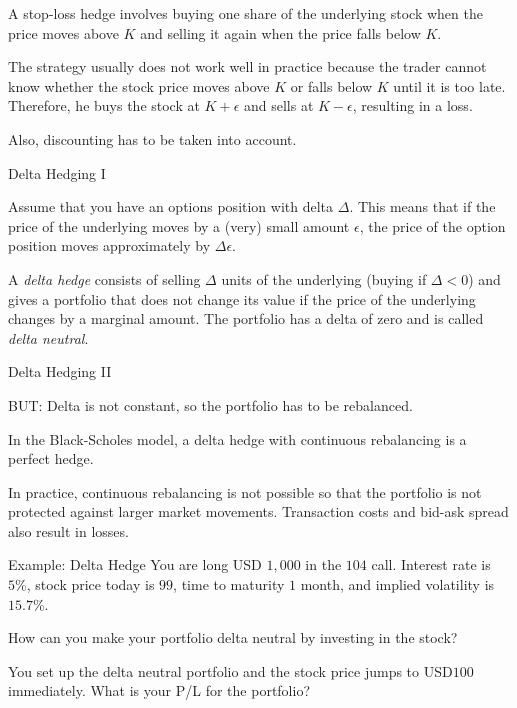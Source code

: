 	A stop-loss hedge involves buying one share of the underlying stock when
  the price moves above $K$ and selling it again when the price falls below $K$.

	The strategy usually does not work well in practice because the trader
  cannot know whether the stock price moves above $K$ or falls below $K$ until
  it is too late. Therefore, he buys the stock at $K+\epsilon$ and sells at
  $K-\epsilon$, resulting in a loss.

	Also, discounting has to be taken into account.


{Delta Hedging I}


	Assume that you have an options position with delta $\Delta$. This means
  that if the price of the underlying moves by a (very) small amount $\epsilon$, the
  price of the option position moves approximately by $\Delta \epsilon$.

	A \emph{delta hedge} consists of selling $\Delta$ units of the
  underlying (buying if $\Delta <0$) and gives a portfolio that does not
  change its value if the price of the underlying changes by a marginal amount.
  The portfolio has a delta of zero and is called \emph{delta neutral}.


{Delta Hedging II}


	BUT: Delta is not constant, so the portfolio has to be rebalanced.

	In the Black-Scholes model, a delta hedge with continuous rebalancing is
  a perfect hedge.

	In practice, continuous rebalancing is not possible so that the
  portfolio is not protected against larger market movements. Transaction
  costs and bid-ask spread also result in losses.


{Example: Delta Hedge}
You are long USD $1,000$ in the $104$ call. Interest rate is $5\%$,
stock price today is $99$, time to maturity $1$ month, and implied volatility is
$15.7\%$.


	How can you make your portfolio delta neutral by investing in the stock?

	You set up the delta neutral portfolio and the stock price jumps to
  USD$100$ immediately. What is your P/L for the portfolio?

